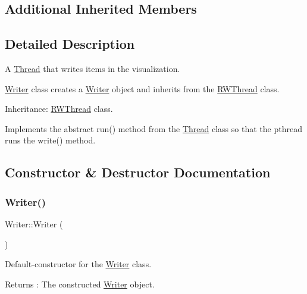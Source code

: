 \subsection*{Additional Inherited Members}


\subsection{Detailed Description}
A \hyperlink{class_thread}{Thread} that writes items in the visualization. 

\hyperlink{class_writer}{Writer} class creates a \hyperlink{class_writer}{Writer} object and inherits from the \hyperlink{class_r_w_thread}{R\+W\+Thread} class.

Inheritance\+: \hyperlink{class_r_w_thread}{R\+W\+Thread} class.

Implements the abstract run() method from the \hyperlink{class_thread}{Thread} class so that the pthread runs the write() method. 

\subsection{Constructor \& Destructor Documentation}
\mbox{\label{class_writer_aedc04cd5fb7b4b99d3ad906fef2116ce}} 
\subsubsection{\texorpdfstring{Writer()}{Writer()}\hspace{0.1cm}{\footnotesize\ttfamily [1/2]}}
{\footnotesize\ttfamily Writer\+::\+Writer (\begin{DoxyParamCaption}{ }\end{DoxyParamCaption})}



Default-\/constructor for the \hyperlink{class_writer}{Writer} class. 

\begin{DoxyReturn}{Returns}
\+: The constructed \hyperlink{class_writer}{Writer} object. 
\end{DoxyReturn}
\mbox{\label{class_writer_a53cf1f8d2b8bee756303a54a9b05c04d}} 
